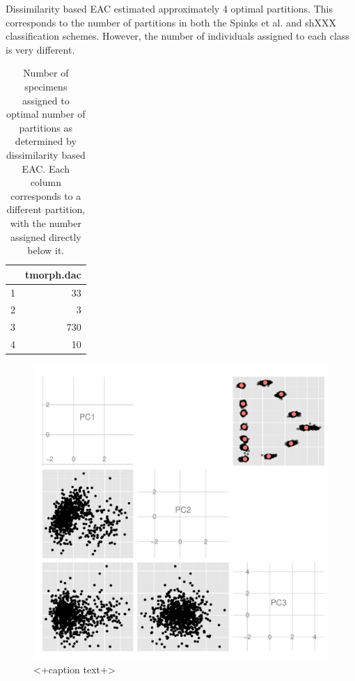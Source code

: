 \documentclass{article}\usepackage{graphicx, color}
\begin{document}
Dissimilarity based EAC estimated approximately 4 optimal partitions. This corresponds to the number of partitions in both the Spinks et al. and shXXX classification schemes. However, the number of individuals assigned to each class is very different.

\begin{table}[ht]
\begin{center}
\begin{tabular}{rr}
  \hline
 & tmorph.dac \\ 
  \hline
1 &  33 \\ 
  2 &   3 \\ 
  3 & 730 \\ 
  4 &  10 \\ 
   \hline
\end{tabular}
\caption{Number of specimens assigned to optimal number of partitions as determined by dissimilarity based EAC. Each column corresponds to a different partition, with the number assigned directly below it.}
\label{tab:dac}
\end{center}
\end{table}






\begin{figure}[ht]
  \centering
  \includegraphics[width = \textwidth]{figure/gm}
  \caption{<+caption text+>}
  \label{fig:gm}
\end{figure}
\end{document}
